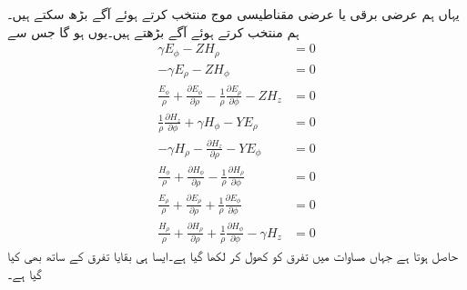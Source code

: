 یہاں ہم عرضی برقی یا عرضی مقناطیسی موج منتخب کرتے ہوئے آگے بڑھ سکتے ہیں۔ہم  منتخب کرتے ہوئے آگے بڑھتے ہیں۔یوں  ہو گا جس سے
\begin{align}
\gamma E_{\phi}-Z H_{\rho}&=0 \label{مساوات_مویج_نلکی_عرضی_برقی_الف}\\
-\gamma E_\rho-Z  H_{\phi}&=0  \label{مساوات_مویج_نلکی_عرضی_برقی_ب} \\
\frac{E_{\phi}}{\rho}+\frac{\partial E_{\phi}}{\partial \rho}-\frac{1}{\rho}\frac{\partial E_{\rho}}{\partial \phi} -Z H_{z}&=0  \label{مساوات_مویج_نلکی_عرضی_برقی_پ}\\
\frac{1}{\rho}\frac{\partial H_z}{\partial \phi} +\gamma  H_{\phi}-Y E_{\rho}&=0  \label{مساوات_مویج_نلکی_عرضی_برقی_ت}\\
-\gamma H_\rho-\frac{\partial H_z}{\partial \rho}-Y E_{\phi}&=0  \label{مساوات_مویج_نلکی_عرضی_برقی_ٹ} \\
\frac{H_{\phi}}{\rho}+\frac{\partial H_{\phi}}{\partial \rho}-\frac{1}{\rho}\frac{\partial H_{\rho}}{\partial \phi}&=0 \label{مساوات_مویج_نلکی_عرضی_برقی_ث} \\
\frac{E_{\rho}}{\rho}+\frac{\partial E_{\rho}}{\partial \rho}+\frac{1}{\rho}\frac{\partial E_{\phi}}{\partial \phi}  &=0 \label{مساوات_مویج_نلکی_عرضی_برقی_ج}\\
\frac{H_{\rho}}{\rho}+\frac{\partial  H_{\rho}}{\partial \rho}+\frac{1}{\rho}\frac{\partial H_{\phi}}{\partial \phi}  -\gamma  H_{z}&=0 \label{مساوات_مویج_نلکی_عرضی_برقی_چ}
\end{align}
حاصل ہوتا ہے جہاں مساوات  میں  تفرق  کو کھول
 کر  لکھا گیا ہے۔ایسا ہی بقایا تفرق کے ساتھ بھی کیا گیا ہے۔

